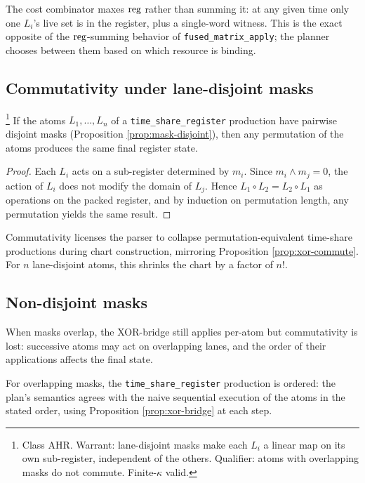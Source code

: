 The cost combinator maxes $\operatorname{reg}$ rather than summing
it: at any given time only one $L_i$'s live set is in
the register, plus a single-word witness. This is the
exact opposite of the $\operatorname{reg}$-summing behavior of
\texttt{fused\_matrix\_apply}; the planner chooses
between them based on which resource is binding.

\subsection{Commutativity under lane-disjoint masks}

\begin{proposition}
  \label{prop:ts-commute}
  \footnote{Class \textsf{AHR}. Warrant: lane-disjoint
  masks make each $L_i$ a linear map on its own
  sub-register, independent of the others.
  Qualifier: atoms with overlapping masks do not
  commute. Finite-$\kappa$ valid.}
  If the atoms $L_1, \ldots, L_n$ of a
  \texttt{time\_share\_register} production have
  pairwise disjoint masks (Proposition
  \ref{prop:mask-disjoint}), then any permutation of
  the atoms produces the same final register state.
\end{proposition}

\begin{proof}
  Each $L_i$ acts on a sub-register determined by
  $m_i$. Since $m_i \wedge m_j = 0$, the action of
  $L_i$ does not modify the domain of $L_j$. Hence
  $L_1 \circ L_2 = L_2 \circ L_1$ as operations on
  the packed register, and by induction on permutation
  length, any permutation yields the same result.
\end{proof}

\begin{remark}
  Commutativity licenses the parser to collapse
  permutation-equivalent time-share productions
  during chart construction, mirroring
  Proposition \ref{prop:xor-commute}. For $n$
  lane-disjoint atoms, this shrinks the chart by a
  factor of $n!$.
\end{remark}

\subsection{Non-disjoint masks}

When masks overlap, the XOR-bridge still applies
per-atom but commutativity is lost: successive atoms
may act on overlapping lanes, and the order of their
applications affects the final state.

\begin{proposition}\label{prop:ts-ordered}
  For overlapping masks, the
  \texttt{time\_share\_register} production is
  ordered: the plan's semantics agrees with the
  naive sequential execution of the atoms in the
  stated order, using Proposition \ref{prop:xor-bridge}
  at each step.
\end{proposition}

